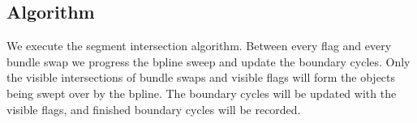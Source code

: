 \documentclass[11pt]{article}
\begin{document}
\subsection{Algorithm}
We execute the segment intersection algorithm.
Between every flag and every bundle swap we progress the bpline sweep and update the boundary cycles.
Only the visible intersections of bundle swaps and visible flags will form the objects being swept over by the bpline.
The boundary cycles will be updated with the visible flags, and finished boundary cycles will be recorded.
\end{document}
